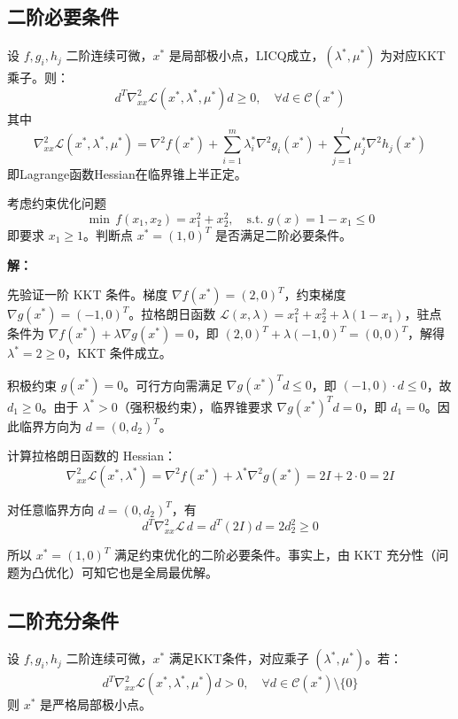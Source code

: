 \subsection{二阶必要条件}

\begin{theorem}[二阶必要条件]
设 $f, g_i, h_j$ 二阶连续可微，$x^*$ 是局部极小点，LICQ成立，$(\lambda^*, \mu^*)$ 为对应KKT乘子。则：
\[
d^T \nabla_{xx}^2 \mathcal{L}(x^*, \lambda^*, \mu^*) d \geq 0, \quad \forall d \in \mathcal{C}(x^*)
\]
其中
\[
\nabla_{xx}^2 \mathcal{L}(x^*, \lambda^*, \mu^*) = \nabla^2 f(x^*) + \sum_{i=1}^m \lambda_i^* \nabla^2 g_i(x^*) + \sum_{j=1}^l \mu_j^* \nabla^2 h_j(x^*)
\]
即Lagrange函数Hessian在临界锥上半正定。
\end{theorem}

\begin{example}[二阶必要条件验证]\label{ex:second-order-necessary}
考虑约束优化问题
\[
\min \, f(x_1, x_2) = x_1^2 + x_2^2, \quad \text{s.t. } g(x) = 1 - x_1 \leq 0
\]
即要求 $x_1 \geq 1$。判断点 $x^* = (1, 0)^T$ 是否满足二阶必要条件。

\textbf{解：}

先验证一阶 KKT 条件。梯度 $\nabla f(x^*) = (2, 0)^T$，约束梯度 $\nabla g(x^*) = (-1, 0)^T$。拉格朗日函数 $\mathcal{L}(x, \lambda) = x_1^2 + x_2^2 + \lambda(1 - x_1)$，驻点条件为 $\nabla f(x^*) + \lambda \nabla g(x^*) = 0$，即 $(2, 0)^T + \lambda (-1, 0)^T = (0, 0)^T$，解得 $\lambda^* = 2 \geq 0$，KKT 条件成立。

积极约束 $g(x^*) = 0$。可行方向需满足 $\nabla g(x^*)^T d \leq 0$，即 $(-1, 0) \cdot d \leq 0$，故 $d_1 \geq 0$。由于 $\lambda^* > 0$（强积极约束），临界锥要求 $\nabla g(x^*)^T d = 0$，即 $d_1 = 0$。因此临界方向为 $d = (0, d_2)^T$。

计算拉格朗日函数的 Hessian：
\[
\nabla_{xx}^2 \mathcal{L}(x^*, \lambda^*) = \nabla^2 f(x^*) + \lambda^* \nabla^2 g(x^*) = 2I + 2 \cdot 0 = 2I
\]

对任意临界方向 $d = (0, d_2)^T$，有
\[
d^T \nabla_{xx}^2 \mathcal{L} \, d = d^T (2I) d = 2 d_2^2 \geq 0
\]

所以 $x^* = (1, 0)^T$ 满足约束优化的二阶必要条件。事实上，由 KKT 充分性（问题为凸优化）可知它也是全局最优解。
\end{example}

\subsection{二阶充分条件}

\begin{theorem}[二阶充分条件]
设 $f, g_i, h_j$ 二阶连续可微，$x^*$ 满足KKT条件，对应乘子 $(\lambda^*, \mu^*)$。若：
\[
d^T \nabla_{xx}^2 \mathcal{L}(x^*, \lambda^*, \mu^*) d > 0, \quad \forall d \in \mathcal{C}(x^*) \setminus \{0\}
\]
则 $x^*$ 是严格局部极小点。
\end{theorem}

